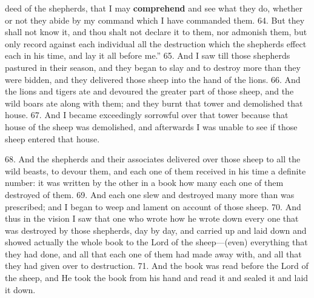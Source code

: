deed of the shepherds, that I may \textbf{comprehend} and
see what they do, whether or not they abide by my
command which I have commanded them. 64. But
they shall not know it, and thou shalt not declare it
to them, nor admonish them, but only record against
each individual all the destruction which the shepherds
effect each in his time, and lay it all before me.”
65. And I saw till those shepherds pastured in their
season, and they began to slay and to destroy more
than they were bidden, and they delivered those sheep
into the hand of the lions. 66. And the lions and
tigers ate and devoured the greater part of those
sheep, and the wild boars ate along with them; and
they burnt that tower and demolished that house.
67. And I became exceedingly sorrowful over that
tower because that house of the sheep was demolished,
and afterwards I was unable to see if those
sheep entered that house.


68. And the shepherds and their associates delivered
over those sheep to all the wild beasts, to
devour them, and each one of them received in his
time a definite number: it was written by the other
in a book how many each one of them destroyed of
them. 69. And each one slew and destroyed many
more than was prescribed; and I began to weep and
lament on account of those sheep. 70. And thus
in the vision I saw that one who wrote how he wrote
down every one that was destroyed by those shepherds,
day by day, and carried up and laid down and showed
actually the whole book to the Lord of the sheep—(even)
everything that they had done, and all that
each one of them had made away with, and all that
they had given over to destruction. 71. And the
book was read before the Lord of the sheep, and He
took the book from his hand and read it and sealed
it and laid it down.


